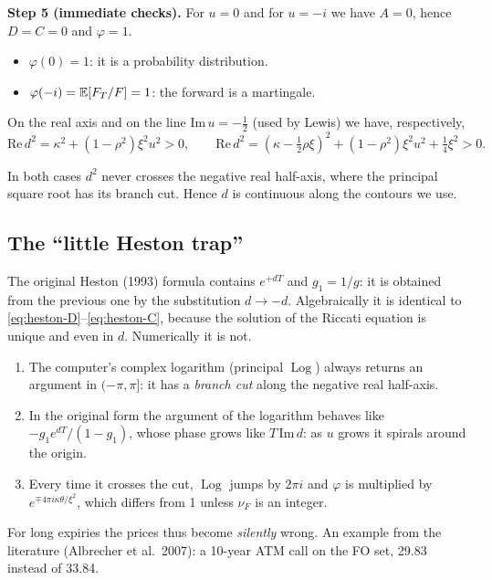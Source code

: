 \textbf{Step 5 (immediate checks).} For $u=0$ and for $u=-i$ we have $A=0$, hence $D=C=0$ and $\varphi=1$.
\begin{itemize}
\item $\varphi(0)=1$: it is a probability distribution.
\item $\varphi(-i)=\mathbb{E}[F_T/F]=1$: the forward is a martingale.
\end{itemize}

\begin{perche}[title={Why the complex square root does not jump}]
On the real axis and on the line $\mathrm{Im}\,u=-\tfrac12$ (used by Lewis) we have, respectively,
\[
\mathrm{Re}\,d^2=\kappa^2+(1-\rho^2)\xi^2u^2>0,\qquad
\mathrm{Re}\,d^2=(\kappa-\tfrac12\rho\xi)^2+(1-\rho^2)\xi^2u^2+\tfrac14\xi^2>0 .
\]

In both cases $d^2$ never crosses the negative real half-axis, where the principal square root has its branch cut.
Hence $d$ is continuous along the contours we use.
\end{perche}

\subsection{The ``little Heston trap''}
The original Heston (1993) formula contains $e^{+dT}$ and $g_1=1/g$: it is obtained from the previous one by the
substitution $d\to-d$. Algebraically it is identical to \eqref{eq:heston-D}--\eqref{eq:heston-C}, because the
solution of the Riccati equation is unique and even in $d$. Numerically it is not.

\begin{enumerate}
\item The computer's complex logarithm (principal $\operatorname{Log}$) always returns an argument in $(-\pi,\pi]$: it
has a \emph{branch cut} along the negative real half-axis.
\item In the original form the argument of the logarithm behaves like $-g_1e^{dT}/(1-g_1)$, whose phase grows like
$T\,\mathrm{Im}\,d$: as $u$ grows it spirals around the origin.
\item Every time it crosses the cut, $\operatorname{Log}$ jumps by $2\pi i$ and $\varphi$ is multiplied by
$e^{\mp4\pi i\kappa\theta/\xi^2}$, which differs from 1 unless $\nu_F$ is an integer.
\end{enumerate}
For long expiries the prices thus become \emph{silently} wrong. An example from the literature (Albrecher et
al.\ 2007): a 10-year ATM call on the FO set, 29.83 instead of 33.84.

